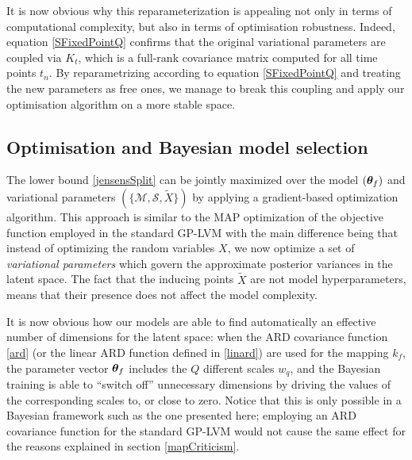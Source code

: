 It is now obvious why this reparameterization is appealing not only in terms of computational
complexity, but also in terms of optimisation robustness. Indeed, equation \eqref{SFixedPointQ} 
confirms that the original variational parameters are coupled via $K_t$, which is a full-rank covariance matrix
computed for all time points $t_n$. By reparametrizing according to equation \eqref{SFixedPointQ} and treating
the new parameters as free ones, we manage to break this coupling and apply our optimisation algorithm on a
more stable space.




\subsection{Optimisation and Bayesian model selection}

The lower bound \eqref{jensensSplit} can be jointly maximized over the
model $\left( \boldsymbol \theta_f \right)$ and variational parameters $ \left( \{ \mathcal{M}, \mathcal{S}, \tilde{X} \} \right) $
by applying a gradient-based optimization algorithm. This approach is
similar to the MAP optimization of the objective function employed in the standard GP-LVM \cite{GPLVM} with the main
difference being that instead of optimizing the random variables $X$, we now optimize a set of \textit{variational
  parameters} which govern the approximate posterior variances in the latent space. The fact that the inducing points
$\tilde{X}$ are not model hyperparameters, means that their presence does not affect the model complexity.
%

It is now obvious how our models
are able to find automatically an effective number of dimensions for the latent space:
when the ARD covariance function \eqref{ard} (or the linear ARD function defined in \eqref{linard}) are used for the mapping
$k_f$, the parameter vector $\boldsymbol \theta_f$ includes the $Q$ different scales $w_q$,
and the Bayesian training is able to ``switch off'' unnecessary dimensions by driving the values of the corresponding
scales to, or close to zero. 
 Notice that this is only possible in a Bayesian framework such as the one presented here;
employing an ARD covariance function for the standard GP-LVM would not cause the same effect for the
reasons explained in section \ref{mapCriticism}.

